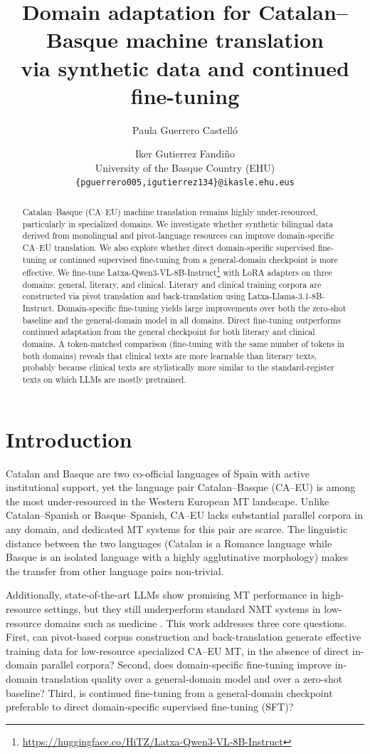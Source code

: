 \documentclass[11pt,a4paper]{article}
\title{Domain adaptation for Catalan--Basque machine translation\\
via synthetic data and continued fine-tuning}
\author{Paula Guerrero Castelló \and Iker Gutierrez Fandiño \\
  University of the Basque Country (EHU) \\
  {\tt \{pguerrero005,igutierrez134\}@ikasle.ehu.eus}}
\date{}
\begin{document}
\setlength{\footskip}{45pt}
\maketitle
\thispagestyle{plain}
\pagestyle{plain}

\begin{abstract}
Catalan--Basque (CA--EU) machine translation remains highly
under-resourced, particularly in specialized domains. We investigate
whether synthetic bilingual data derived from monolingual and
pivot-language resources can improve domain-specific CA--EU translation. We also explore whether direct domain-specific supervised fine-tuning or continued supervised
fine-tuning from a general-domain checkpoint is more effective.
We fine-tune Latxa-Qwen3-VL-8B-Instruct\footnote{\url{https://huggingface.co/HiTZ/Latxa-Qwen3-VL-8B-Instruct}} with LoRA
adapters on three domains: general, literary, and clinical. Lite\-rary
and clinical training corpora are constructed via pivot translation and
back-translation using Latxa-Llama-3.1-8B-Instruct.
Domain-specific fine-tuning yields large improvements over both the
zero-shot baseline and the general-domain model in all domains.
Direct fine-tuning outperforms continued adaptation from the general
checkpoint for both literary and clinical domains. A token-matched
comparison (fine-tuning with the same number of tokens in both domains) reveals that clinical texts are more learnable
than literary texts, probably because clinical texts are stylistically more similar to the standard-register texts on which LLMs are mostly pretrained.
\end{abstract}

\section{Introduction}

Catalan and Basque are two co-official languages of Spain with active
institutional support, yet the language pair Catalan--Basque (CA--EU)
is among the most under-resourced in the Western European MT landscape.
Unlike Catalan--Spanish or Basque--Spanish, CA--EU lacks substantial
parallel corpora in any domain, and dedicated MT systems for this pair
are scarce. The linguistic distance between the two languages (Catalan
is a Romance language while Basque is an isolated language with a
highly agglutinative morphology) makes the transfer from other
language pairs non-trivial.

Additionally, state-of-the-art LLMs show promising MT performance in high-resource
settings, but they still underperform standard NMT systems in low-resource
domains such as medicine \cite{bawden-yvon-2023-investigating}.
This work addresses three core questions. First, can pivot-based
corpus construction and back-translation generate effective training
data for low-resource specialized CA--EU MT, in the absence of
direct in-domain parallel corpora? Second, does domain-specific
fine-tuning improve in-domain translation quality over a general-domain
model and over a zero-shot baseline? Third, is continued fine-tuning
from a general-domain checkpoint preferable to direct domain-specific
supervised fine-tuning (SFT)?
\end{document}

